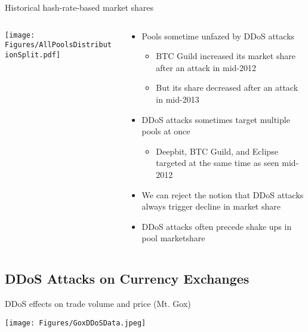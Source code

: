 \documentclass{beamer}
\begin{document}
\begin{frame}{Historical hash-rate-based market shares}
\begin{columns}[t]
\begin{column}[T]{5cm}
\texttt{[image: Figures/AllPoolsDistributionSplit.pdf]}
\end{column}
\hspace{-5em}
\begin{column}[C]{9cm}
\begin{itemize}
	\item Pools sometime unfazed by DDoS attacks\begin{itemize}	
		\item BTC Guild increased its market share after an attack in mid-2012
		\item But its share decreased after an attack in mid-2013
	\end{itemize}
	\item DDoS attacks sometimes target multiple pools at once
	\begin{itemize}
		\item Deepbit, BTC Guild, and Eclipse targeted at the same time as seen mid-2012
	\end{itemize}
	\item We can reject the notion that DDoS attacks always trigger decline in market share
	\item DDoS attacks often precede shake ups in pool marketshare
\end{itemize}
\end{column}
\end{columns}
\end{frame}

\subsection{DDoS Attacks on Currency Exchanges}


\begin{frame}{DDoS effects on trade volume and price (Mt. Gox)}
\begin{center}
	\centering
	\texttt{[image: Figures/GoxDDoSData.jpeg]}
\end{center}
\end{frame}
\end{document}
